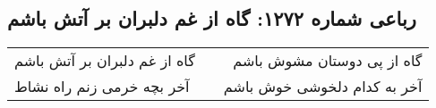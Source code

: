\begin{center}
\section*{رباعی شماره ۱۲۷۲: گاه از غم دلبران بر آتش باشم}
\label{sec:1272}
\begin{longtable}{l p{0.5cm} r}
گاه از غم دلبران بر آتش باشم
&&
گاه از پی دوستان مشوش باشم
\\
آخر بچه خرمی زنم راه نشاط
&&
آخر به کدام دلخوشی خوش باشم
\\
\end{longtable}
\end{center}
